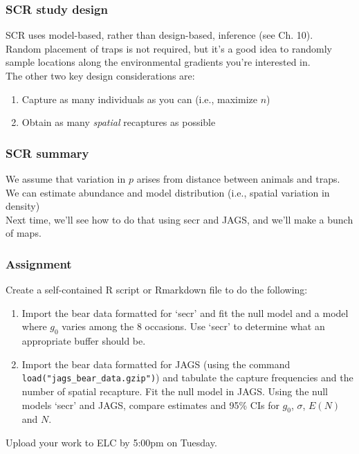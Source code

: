\documentclass[color=usenames,dvipsnames]{beamer}\usepackage[]{graphicx}\usepackage[]{xcolor}
\newcommand{\inr}[1]{\colorbox{inlinecolor}{\texttt{#1}}}
\begin{document}
\begin{frame}
  \frametitle{SCR study design}
  SCR uses model-based, rather than design-based,
  inference (see Ch. 10). \\ 
  \pause
  \vfill
  Random placement of traps is not required, but it's a good idea to
  randomly sample locations along the environmental gradients you're
  interested in. \\
  \pause \vfill
  The other two key design considerations are:
  \begin{enumerate}
    \item<3-> Capture as many individuals as you can (i.e., maximize $n$)
    \item<4-> Obtain as many {\it spatial} recaptures as possible
  \end{enumerate}
  \vfill
\end{frame}



\begin{frame}
  \frametitle{SCR summary}
  We assume that variation in $p$ arises from distance between animals
  and traps. \\
  \pause \vfill
  We can estimate abundance and model distribution (i.e., spatial
  variation in density) \\
  \pause \vfill
  Next time, we'll see how to do that using secr and JAGS, and we'll
  make a bunch of maps. \\
\end{frame}








\begin{frame}[fragile]
  \frametitle{Assignment}
  Create a self-contained R script or Rmarkdown file to do the
  following: 
  \vfill
  \begin{enumerate}
    \item Import the bear data formatted for `secr' and fit the null
      model and a model where $g_0$ varies among the 8 occasions. Use
      `secr' to determine what an appropriate buffer should be.
    \item Import the bear data formatted for JAGS (using the command
      \inr{load("jags\_bear\_data.gzip")}) and tabulate the 
      capture frequencies and the number of spatial recapture. Fit the
      null model in JAGS. Using the null models `secr' and JAGS,
      compare estimates and 95\% CIs for $g_{0}$, $\sigma$, $E(N)$ and $N$.
  \end{enumerate}
  \vfill
  Upload your work to ELC by 5:00pm on Tuesday. 
\end{frame}
\end{document}
